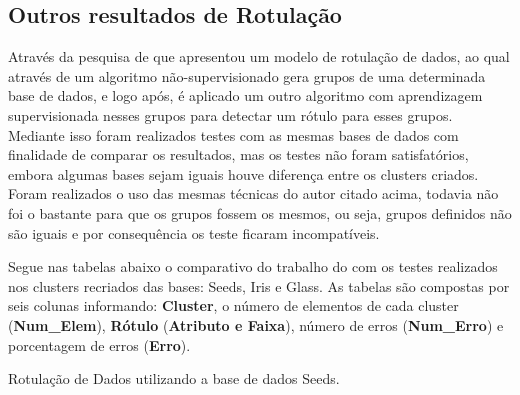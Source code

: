 
\begin{apendicesenv}

\partapendices

\chapter{Outros resultados de Rotulação }
\label{apendice:1}

Através da pesquisa de  que apresentou um modelo de rotulação de dados, ao qual através de um algoritmo não-supervisionado gera grupos de uma determinada base de dados, e logo após, é aplicado um outro algoritmo com aprendizagem supervisionada nesses grupos para detectar um rótulo para esses grupos. Mediante isso foram realizados testes com as mesmas bases de dados com finalidade de comparar os resultados, mas os testes não foram satisfatórios, embora algumas bases sejam iguais houve diferença entre os clusters criados. Foram realizados o uso das mesmas técnicas do autor citado acima, todavia não foi o bastante para que os grupos fossem os mesmos, ou seja, grupos definidos não são iguais e por consequência os teste ficaram incompatíveis.

Segue nas tabelas abaixo o comparativo do trabalho do \cite{Lopes2016} com os testes realizados nos clusters recriados das bases: Seeds, Iris e Glass. As tabelas são compostas por seis colunas informando: \textbf{Cluster}, o número de elementos de cada cluster (\textbf{Num\_Elem}), \textbf{Rótulo} (\textbf{\textbf{Atributo} e \textbf{Faixa}}), número de erros (\textbf{Num\_Erro}) e porcentagem de erros (\textbf{Erro}).


\begin{table}[H]
 \centering
 
 \caption{Rotulação de Dados utilizando a base de dados Seeds.}
\label{tab:comparativo:seeds}


\end{table}
\end{apendicesenv}

